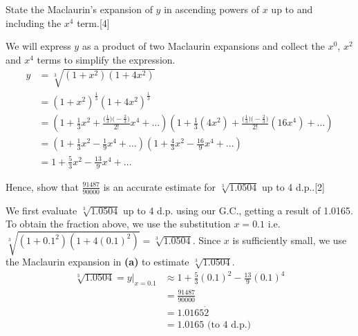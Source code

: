 \documentclass[12pt, a4 paper]{article}
\begin{document}
\begin{outline}[enumerate]
 \2 State the Maclaurin's expansion of \(y\) in ascending powers of \(x\) up to and including the \(x^4\) term.\hfill[4]
 \begin{answer}
   We will express $y$ as a product of two Maclaurin expansions and collect the $x^0$, $x^2$ and $x^4$ terms to simplify the expression.
   \begin{align*}
     y&=\sqrt[3]{(1+x^2)(1+4x^2)} \\
     &= (1+x^2)^{\frac{1}{3}}(1+4x^2)^{\frac{1}{3}} \\
     &= \left(1+\frac{1}{3}x^2+\frac{\big(\frac{1}{3})\big(-\frac{2}{3})}{2!}x^4+\dots\right)\left(1+\frac{1}{3}(4x^2)+\frac{\big(\frac{1}{3})\big(-\frac{2}{3})}{2!}(16x^4)+\dots\right) \\
     &= \left(1+\frac{1}{3}x^2-\frac{1}{9}x^4+\dots\right)\left(1+\frac{4}{3}x^2-\frac{16}{9}x^4+\dots\right) \\
     &= 1 + \frac{5}{3}x^2 - \frac{13}{9}x^4 +\dots
   \end{align*}
 \end{answer}
 \2 Hence, show that \(\frac{91487}{90000}\) is an accurate estimate for \(\sqrt[3]{1.0504}\)  up to 4 d.p..\hfill[2]
 \begin{answer}
   We first evaluate $\sqrt[3]{1.0504}$ up to 4 d.p. using our G.C., getting a result of 1.0165. To obtain the fraction above, we use the substitution $x=0.1$ i.e. $\sqrt[3]{(1+0.1^2)(1+4(0.1)^2)}=\sqrt[3]{1.0504}$. Since $x$ is sufficiently small, we use the Maclaurin expansion in \textbf{(a)} to estimate $\sqrt[3]{1.0504}$.
   \begin{align*}
     \sqrt[3]{1.0504} = \left.y\right|_{x=0.1} &\approx 1 + \frac{5}{3}(0.1)^2 - \frac{13}{9}(0.1)^4 \\
     &= \frac{91487}{90000} \\
     &= 1.0165\dot{2} \\
     &= 1.0165 \textrm{ (to 4 d.p.)}
   \end{align*}
 \end{answer}


\end{outline}
\end{document}
